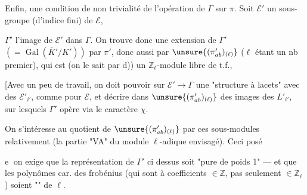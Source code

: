  Enfin,  une condition
 de non trivialité de l'opération de \(\Gamma\) sur \(\pi\).
Soit \(\mathcal E'\) un sous-groupe 
(d'indice fini) de \(\mathcal E\),


\(\Gamma'\) l'image de \(\mathcal E'\) dans \(\Gamma\). On trouve donc une
extension de \(\Gamma'\) \((=\operatorname{Gal}(\overline K'/K'))\) par \(\pi'\),
donc aussi par \(\unsure{(\pi'_{ab})_{(\ell)}}\)
(\(\ell\) étant un nb premier), qui est (on le sait par d)) un
\(\mathbb Z_\ell\)-module libre de t.f.,

[Avec un peu de travail, on doit pouvoir  sur
\(\mathcal E'\to\Gamma\) une "structure à lacets" avec des
\(\mathcal E'_{i'}\), comme pour \(\mathcal E\), et décrire dans
\(\unsure{(\pi'_{ab})_{(\ell)}}\)
 des images des  \(L'_{i'}\),
sur lesquels \(\Gamma'\) opère  via le caractère \(\chi\).


On s'intéresse au quotient de \(\unsure{(\pi'_{ab})_{(\ell)}}\) par ces
sous-modules relativement  (la partie "VA" du
module \(\ell\)-adique envisagé). Ceci posé

\textcircled{e} on exige que la représentation de \(\Gamma'\) ci dessus soit
"pure de poids 1" ---  et que les polynômes car.
des frobénius (qui sont à coefficients \(\in\mathbb Z\), pas seulement
\(\in\mathbb Z_\ell\)) soient "" de \(\ell\).


